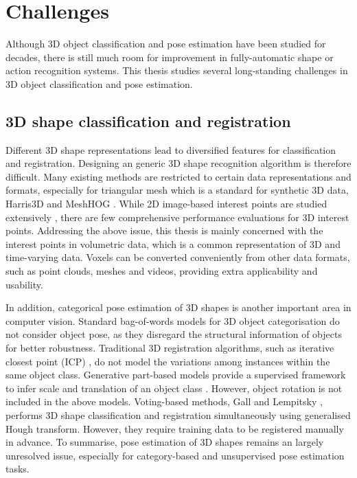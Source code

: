 \section{Challenges}

Although 3D object classification and pose estimation have been studied for decades, there is still much room for improvement in fully-automatic shape or action recognition systems. 
This thesis studies several long-standing challenges in 3D object classification and pose estimation.  

\subsection{3D shape classification and registration} 

Different 3D shape representations lead to diversified features for classification and registration. Designing an generic 3D shape recognition algorithm is therefore difficult. Many existing methods are restricted to certain data representations and formats, especially for triangular mesh which is a standard for synthetic 3D data, \eg Harris3D \cite{Sipiran2011} and MeshHOG \cite{Zaharescu2009}.     
While 2D image-based interest points are studied extensively \cite{Mikolajczyk2005}, there are few comprehensive performance evaluations for 3D interest points. 
Addressing the above issue, this thesis is mainly concerned with the interest points in volumetric data, which is a common representation of 3D and time-varying data. Voxels can be converted conveniently from other data formats, such as point clouds, meshes and videos, providing extra applicability and usability. 

In addition, categorical pose estimation of 3D shapes is another important area in computer vision.
Standard bag-of-words models for 3D object categorisation do not consider object pose, as they disregard the structural information of objects for better robustness. Traditional 3D registration algorithms, such as iterative closest point (ICP) \cite{Besl1992}, do not model the variations among instances within the same object class. 
Generative part-based models provide a supervised framework to infer scale and translation of an object class \cite{Weber2000, Fergus2007}. However, object rotation is not included in the above models. 
Voting-based methods, \eg Gall and Lempitsky \cite{Gall2009a}, performs 3D shape classification and registration simultaneously using generalised Hough transform. However, they require training data to be registered manually in advance.  
To summarise, pose estimation of 3D shapes remains an largely unresolved issue, especially for category-based and unsupervised pose estimation tasks.  

